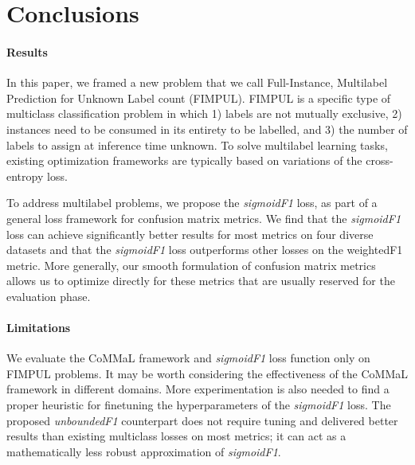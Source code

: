 
\section{Conclusions}
\label{sec:orged3d8a1}


\paragraph{Results}
In this paper, we framed a new problem that we call Full-Instance, Multilabel Prediction for Unknown Label count (FIMPUL). FIMPUL is a specific type of multiclass classification problem in which 1) labels are not mutually exclusive, 2) instances need to be consumed in its entirety to be labelled,
and 3) the number of labels to assign at inference time unknown.
To solve multilabel learning tasks, existing optimization frameworks are typically based on variations of the cross-entropy loss.

To address multilabel problems, we propose the \emph{sigmoidF1} loss, as part of a general loss framework for confusion matrix metrics. We find that the \emph{sigmoidF1} loss can achieve significantly better results for most metrics on four diverse datasets and that the \emph{sigmoidF1} loss outperforms other losses on the weightedF1 metric.
More generally, our smooth formulation of confusion matrix metrics allows us to optimize directly for these metrics that are usually reserved for the evaluation phase.

\paragraph{Limitations}
We evaluate the CoMMaL framework and \emph{sigmoidF1} loss function only on FIMPUL problems. It may be worth considering the effectiveness of the CoMMaL framework in different domains.  More experimentation is also needed to find a proper heuristic for finetuning the hyperparameters of the \emph{sigmoidF1} loss. The proposed \emph{unboundedF1} counterpart does not require tuning and delivered better results than existing multiclass losses on most metrics; it can act as a mathematically less robust approximation of \emph{sigmoidF1}.

